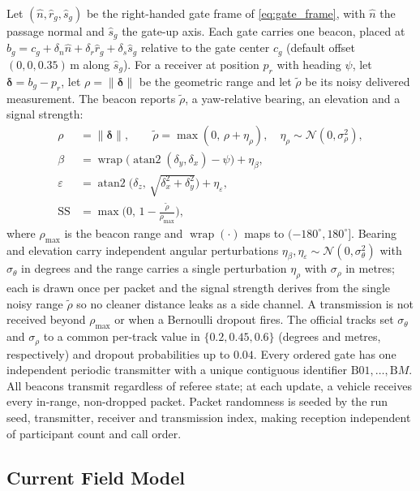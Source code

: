 Let $(\hat{n},\hat{r}_g,\hat{s}_g)$ be the right-handed gate frame of \eqref{eq:gate_frame}, with $\hat{n}$ the passage normal and $\hat{s}_g$ the gate-up axis. Each gate carries one beacon, placed at $b_g=c_g+\delta_n \hat{n}+\delta_r \hat{r}_g+\delta_s \hat{s}_g$ relative to the gate center $c_g$ (default offset $(0,0,0.35)$\,m along $\hat{s}_g$). For a receiver at position $p_r$ with heading $\psi$, let $\boldsymbol{\delta}=b_g-p_r$, let $\rho=\lVert\boldsymbol{\delta}\rVert$ be the geometric range and let $\tilde{\rho}$ be its noisy delivered measurement. The beacon reports $\tilde{\rho}$, a yaw-relative bearing, an elevation and a signal strength:
\begin{align}
\label{eq:beacon}
\rho &= \lVert\boldsymbol{\delta}\rVert,\qquad \tilde{\rho}=\max(0,\,\rho+\eta_\rho),\quad \eta_\rho\sim\mathcal{N}(0,\sigma_\rho^2),\\
\beta &= \operatorname{wrap}\!\big(\operatorname{atan2}(\delta_y,\delta_x)-\psi\big)+\eta_\beta,\\
\varepsilon &= \operatorname{atan2}\!\big(\delta_z,\,\textstyle\sqrt{\delta_x^2+\delta_y^2}\big)+\eta_\varepsilon,\\
\mathrm{SS} &= \max\!\Big(0,\,1-\tfrac{\tilde{\rho}}{\rho_{\max}}\Big),\nonumber
\end{align}
where $\rho_{\max}$ is the beacon range and $\operatorname{wrap}(\cdot)$ maps to $(-180^\circ,180^\circ]$. Bearing and elevation carry independent angular perturbations $\eta_\beta,\eta_\varepsilon\sim\mathcal{N}(0,\sigma_\theta^2)$ with $\sigma_\theta$ in degrees and the range carries a single perturbation $\eta_\rho$ with $\sigma_\rho$ in metres; each is drawn once per packet and the signal strength derives from the single noisy range $\tilde{\rho}$ so no cleaner distance leaks as a side channel. A transmission is not received beyond $\rho_{\max}$ or when a Bernoulli dropout fires. The official tracks set $\sigma_\theta$ and $\sigma_\rho$ to a common per-track value in $\{0.2,0.45,0.6\}$ (degrees and metres, respectively) and dropout probabilities up to $0.04$. Every ordered gate has one independent periodic transmitter with a unique contiguous identifier $\mathrm{B01},\ldots,\mathrm{B}M$. All beacons transmit regardless of referee state; at each update, a vehicle receives every in-range, non-dropped packet. Packet randomness is seeded by the run seed, transmitter, receiver and transmission index, making reception independent of participant count and call order.

\subsection{Current Field Model}

